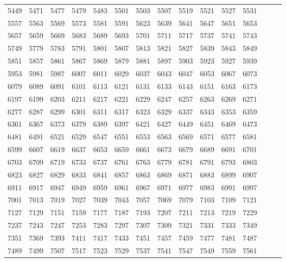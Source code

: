 \documentclass[10pt, a4paper]{article}
\begin{document}
\begin{center}
\begin{longtable}{c c c c c c c c c c c c c c c}
        5449 & 5471 & 5477 & 5479 & 5483 & 5501 & 5503 & 5507 & 5519 & 5521 & 5527 & 5531 \\
        5557 & 5563 & 5569 & 5573 & 5581 & 5591 & 5623 & 5639 & 5641 & 5647 & 5651 & 5653 \\
        5657 & 5659 & 5669 & 5683 & 5689 & 5693 & 5701 & 5711 & 5717 & 5737 & 5741 & 5743 \\
        5749 & 5779 & 5783 & 5791 & 5801 & 5807 & 5813 & 5821 & 5827 & 5839 & 5843 & 5849 \\
        5851 & 5857 & 5861 & 5867 & 5869 & 5879 & 5881 & 5897 & 5903 & 5923 & 5927 & 5939 \\
        5953 & 5981 & 5987 & 6007 & 6011 & 6029 & 6037 & 6043 & 6047 & 6053 & 6067 & 6073 \\
        6079 & 6089 & 6091 & 6101 & 6113 & 6121 & 6131 & 6133 & 6143 & 6151 & 6163 & 6173 \\
        6197 & 6199 & 6203 & 6211 & 6217 & 6221 & 6229 & 6247 & 6257 & 6263 & 6269 & 6271 \\
        6277 & 6287 & 6299 & 6301 & 6311 & 6317 & 6323 & 6329 & 6337 & 6343 & 6353 & 6359 \\
        6361 & 6367 & 6373 & 6379 & 6389 & 6397 & 6421 & 6427 & 6449 & 6451 & 6469 & 6473 \\
        6481 & 6491 & 6521 & 6529 & 6547 & 6551 & 6553 & 6563 & 6569 & 6571 & 6577 & 6581 \\
        6599 & 6607 & 6619 & 6637 & 6653 & 6659 & 6661 & 6673 & 6679 & 6689 & 6691 & 6701 \\
        6703 & 6709 & 6719 & 6733 & 6737 & 6761 & 6763 & 6779 & 6781 & 6791 & 6793 & 6803 \\
        6823 & 6827 & 6829 & 6833 & 6841 & 6857 & 6863 & 6869 & 6871 & 6883 & 6899 & 6907 \\
        6911 & 6917 & 6947 & 6949 & 6959 & 6961 & 6967 & 6971 & 6977 & 6983 & 6991 & 6997 \\
        7001 & 7013 & 7019 & 7027 & 7039 & 7043 & 7057 & 7069 & 7079 & 7103 & 7109 & 7121 \\
        7127 & 7129 & 7151 & 7159 & 7177 & 7187 & 7193 & 7207 & 7211 & 7213 & 7219 & 7229 \\
        7237 & 7243 & 7247 & 7253 & 7283 & 7297 & 7307 & 7309 & 7321 & 7331 & 7333 & 7349 \\
        7351 & 7369 & 7393 & 7411 & 7417 & 7433 & 7451 & 7457 & 7459 & 7477 & 7481 & 7487 \\
        7489 & 7499 & 7507 & 7517 & 7523 & 7529 & 7537 & 7541 & 7547 & 7549 & 7559 & 7561 \\

\end{longtable}
\end{center}
\end{document}
